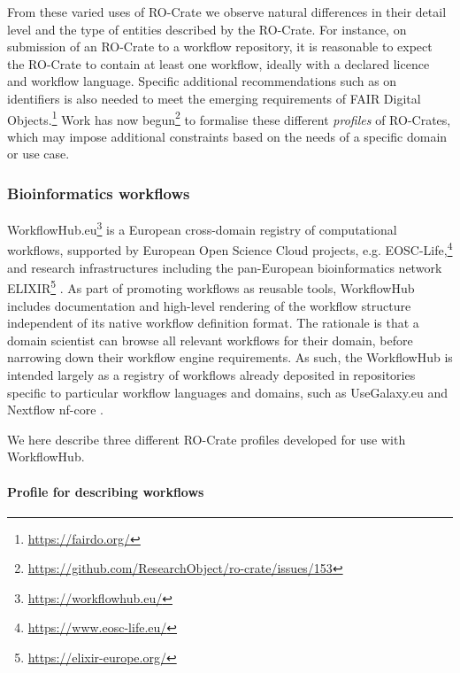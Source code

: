 From these varied uses of RO-Crate we observe natural differences in
their detail level and the type of entities described by the RO-Crate.
For instance, on submission of an RO-Crate to a workflow repository, it
is reasonable to expect the RO-Crate to contain at least one workflow,
ideally with a declared licence and workflow language. Specific
additional recommendations such as on identifiers is also needed to meet
the emerging requirements of FAIR Digital
Objects.\footnote{\url{https://fairdo.org/}} Work has now
begun\footnote{\url{https://github.com/ResearchObject/ro-crate/issues/153}} to
formalise these different \textit{profiles} of RO-Crates, which may impose
additional constraints based on the needs of a specific domain or use case.


\subsubsection{Bioinformatics workflows}\label{ch5:workflows}

WorkflowHub.eu\footnote{\url{https://workflowhub.eu/}} is a European cross-domain
registry of computational workflows, supported by European Open Science
Cloud projects, e.g. EOSC-Life,\footnote{\url{https://www.eosc-life.eu/}} and
research infrastructures including the pan-European bioinformatics
network ELIXIR\footnote{\url{https://elixir-europe.org/}}
\cite{ch5-34}. As part
of promoting workflows as reusable tools, WorkflowHub includes
documentation and high-level rendering of the workflow structure
independent of its native workflow definition format. The rationale is
that a domain scientist can browse all relevant workflows for their
domain, before narrowing down their workflow engine requirements. As
such, the WorkflowHub is intended largely as a registry of workflows
already deposited in repositories specific to particular workflow
languages and domains, such as UseGalaxy.eu
\cite{Baker 2020} and
Nextflow nf-core
\cite{Ewels 2020}.

We here describe three different RO-Crate profiles developed for use
with WorkflowHub.

\paragraph{Profile for describing workflows}
\label{ch5:profile-for-describing-workflows}


